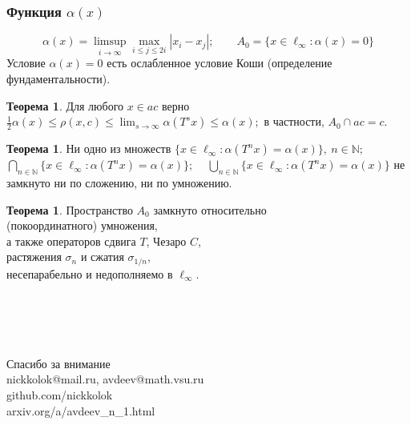 \documentclass[10pt,pdf,hyperref={unicode},aspectratio=169]{beamer}
\theoremstyle{definition}
\newtheorem{ttheorem}[llemma]{Теорема}
\begin{document}
\begin{frame}
	\frametitle{Функция $\alpha(x)$}
	\begin{equation*}
		\alpha(x) = \limsup_{i\to\infty} \max_{i \leq j \leq 2i} |x_i-x_j|
		;\qquad
		A_0 = \{x\in\ell_\infty : \alpha(x) = 0\}
	\end{equation*}
	Условие $\alpha(x) = 0$ есть ослабленное условие Коши (определение фундаментальности).

	\begin{ttheorem}
		Для любого $x\in ac$ верно
		$\displaystyle
			\frac{1}{2} \alpha(x) \leq \rho(x,c)\leq \lim_{s\to\infty} \alpha(T^s x) \leq \alpha(x)
			;
		$
		в частности, $A_0 \cap ac = c$.
	\end{ttheorem}


	\begin{ttheorem}
		Ни одно из множеств
		$\displaystyle
			\{x \in \ell_\infty : \alpha(T^n x) = \alpha(x) \}, ~n\in\mathbb{N};
		$~
		$\displaystyle
			\bigcap\limits_{n\in\mathbb{N}}\{x \in \ell_\infty : \alpha(T^n x) = \alpha(x) \};
		$ ~
		$\displaystyle
			\bigcup_{n\in\mathbb{N}}\{x \in \ell_\infty : \alpha(T^n x) = \alpha(x) \}
		$ не замкнуто ни по сложению, ни по умножению.
	\end{ttheorem}

	\begin{ttheorem}
		Пространство $A_0$ замкнуто относительно
		\\
		(покоординатного) умножения,
		\\
		а также операторов сдвига $T$, Чезаро $C$,
		\\
		растяжения $\sigma_n$ и сжатия $\sigma_{1/n}$,
		\\
		несепарабельно и недополняемо в $\ell_\infty$.
	\end{ttheorem}

\end{frame}




\begin{frame}
	{
		\huge\centering
		~\\~\\~\\~\\
		Спасибо за внимание
	}
	~\\
	\vspace{6.28em}
	nickkolok@mail.ru, avdeev@math.vsu.ru
	\\
	github.com/nickkolok
	\\
	arxiv.org/a/avdeev\_n\_1.html
\end{frame}
\end{document}
